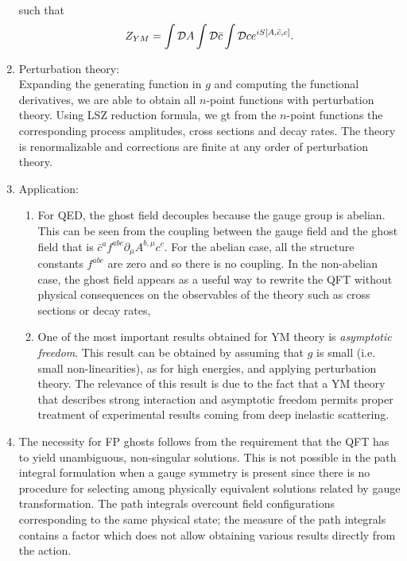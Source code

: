 \begin{enumerate}
\begin{align}
\end{align}
such that
\begin{equation}
Z_{YM} = \int \mathcal{D} A \int \mathcal{D} \bar{c} \int \mathcal{D} c e^{i S[A,\bar{c}, c]}.
\end{equation}
\item Perturbation theory:\\
Expanding the generating function in $g$ and computing the functional derivatives, we are able to obtain all $n$-point functions with perturbation theory. Using LSZ reduction formula, we gt from the $n$-point functions the corresponding process amplitudes, cross sections and decay rates. The theory is renormalizable and corrections are finite at any order of perturbation theory.
\item Application:
\begin{enumerate} 
	\item 
For QED, the ghost field decouples because the gauge group is abelian. This can be seen from the coupling between the gauge field and the ghost field that is $\bar{c}^a f^{abc} \partial_\mu A^{b,\mu} c^c$. For the abelian case, all the structure constants $f^{abc}$ are zero and so there is no coupling. In the non-abelian case, the ghost field appears as a useful way to rewrite the QFT without physical consequences on the observables of the theory such as cross sections or decay rates,
\item One of the most important results obtained for YM theory is \emph{asymptotic freedom}. This result can be obtained by assuming that $g$ is small (i.e. small non-linearities), as for high energies, and applying perturbation theory. The relevance of this result is due to the fact that a YM theory that describes strong interaction and asymptotic freedom permits proper treatment of experimental results coming from deep inelastic scattering.
\end{enumerate}
\item The necessity for FP ghosts follows from the requirement that the QFT has to yield unambiguous, non-singular solutions. This is not possible in the path integral formulation when a gauge symmetry is present since there is no procedure for selecting among physically equivalent solutions related by gauge transformation. The path integrals overcount field configurations corresponding to the same physical state; the measure of the path integrals contains a factor which does not allow obtaining various results directly from the action.
\end{enumerate}
